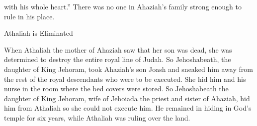 {{}
with his whole
heart.”
There was no
one in Ahaziah’s
family
strong
enough to rule
in his place.
\par }{\SH Athaliah is Eliminated
\par }{\PP {}When Athaliah
the mother
of Ahaziah
saw
that
her son
was dead,
she was determined
to destroy the entire
royal
line
of Judah.
So
Jehoshabeath,
the
daughter
of King
Jehoram, took Ahaziah’s
son
Joash
and sneaked
him away
from
the rest of the royal
descendants
who were to be executed.
She hid him and his nurse
in the room
where the bed
covers were stored. So Jehoshabeath
the daughter
of King
Jehoram,
wife
of Jehoiada
the priest
and sister
of Ahaziah,
hid him from
Athaliah
so she could not
execute him.
He remained
in hiding
in God’s
temple
for six
years,
while Athaliah
was ruling
over
the land.

}
